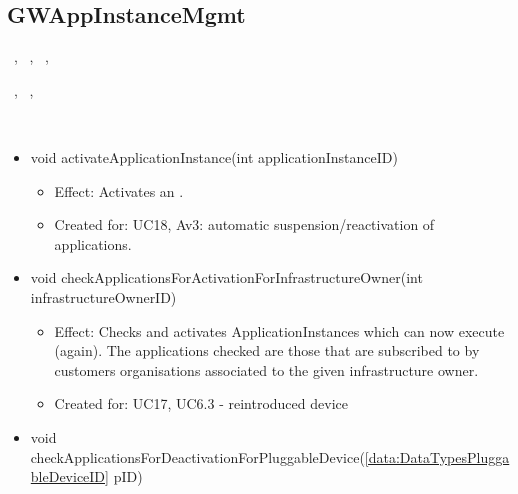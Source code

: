   \subsection{GWAppInstanceMgmt}\label{int:OnlineServiceOnlineServiceApplicationManagerApplicationManagementLogicGWAppInstanceMgmt}
    \begin{description}
      \item[Provided by:] \iconcomponent{}~, \iconcomponent{}~, \iconcomponent{}~, \iconcomponent{}~
      \item[Required by:] \iconcomponent{}~, \iconcomponent{}~, \iconcomponent{}~
      \item[Operations:] ~
    \begin{itemize}[noitemsep,nolistsep,leftmargin=-.25cm]
      \item \textsf{void activateApplicationInstance(int applicationInstanceID)}
        \begin{itemize}[noitemsep,nolistsep]
           \item Effect: Activates an .
\item Created for: UC18, Av3: automatic suspension/reactivation of applications.
        \end{itemize}
      \item \textsf{void checkApplicationsForActivationForInfrastructureOwner(int infrastructureOwnerID)}
        \begin{itemize}[noitemsep,nolistsep]
           \item Effect: Checks and activates ApplicationInstances which can now execute (again). The applications checked are those that are subscribed to by customers organisations associated to the given infrastructure owner.
\item Created for: UC17, UC6.3 - reintroduced device
        \end{itemize}
      \item \textsf{void checkApplicationsForDeactivationForPluggableDevice(\ref{data:DataTypesPluggableDeviceID} pID)}

\end{itemize}
\end{description}
